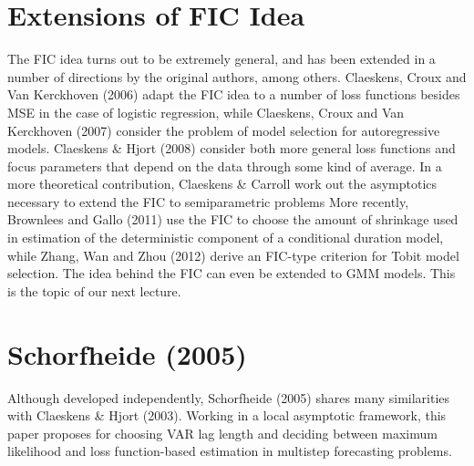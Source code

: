 \documentclass[12pt]{article}
\theoremstyle{definition}
\begin{document}
\section{Extensions of FIC Idea}
The FIC idea turns out to be extremely general, and has been extended in a number of directions by the original authors, among others. Claeskens, Croux and Van Kerckhoven (2006) adapt the FIC idea to a number of loss functions besides MSE in the case of logistic regression, while Claeskens, Croux and Van Kerckhoven (2007) consider the problem of model selection for autoregressive models. Claeskens \& Hjort (2008) consider both more general loss functions and focus parameters that depend on the data through some kind of average. In a more theoretical contribution, Claeskens \& Carroll work out the asymptotics necessary to extend the FIC to semiparametric problems More recently, Brownlees and Gallo (2011) use the FIC to choose the amount of shrinkage used in estimation of the deterministic component of a conditional duration model, while Zhang, Wan and Zhou (2012) derive an FIC-type criterion for Tobit model selection. The idea behind the FIC can even be extended to GMM models. This is the topic of our next lecture.

\section{Schorfheide (2005)}
Although developed independently, Schorfheide (2005) shares many similarities with Claeskens \& Hjort (2003). Working in a local asymptotic framework, this paper proposes for choosing VAR lag length and deciding between maximum likelihood and loss function-based estimation in multistep forecasting problems.
\end{document}

